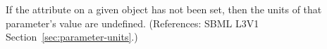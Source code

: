 If the attribute  on a given \Parameter object has not been
set, then the units of that parameter's value are undefined.  (References:
SBML L3V1 Section~\ref{sec:parameter-units}.)
